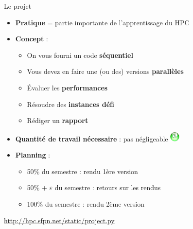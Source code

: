 \documentclass[10pt]{beamer}
\begin{document}
\begin{frame}
  \begin{block}{Le projet}
    \begin{itemize}
    \item \textbf{Pratique} = partie importante de l'apprentissage du HPC

      \medskip
      
    \item \textbf{Concept} :
      \begin{itemize}
      \item On vous fourni un code \textbf{séquentiel}
      \item Vous devez en faire une (ou des) versions \textbf{parallèles}
      \item Évaluer les \textbf{performances}
      \item Résoudre des \textbf{instances défi}
      \item Rédiger un \textbf{rapport}
      \end{itemize}
  
      \medskip

    \item \textbf{Quantité de travail nécessaire} : pas négligeable \includegraphics[width=0.5cm,trim=0 17mm 0 0]{triste}
      
      \medskip
      
    \item \textbf{Planning} :
      \begin{itemize}
      \item 50\% du semestre : rendu 1ère version
      \item 50\% + $\varepsilon$ du semestre : retours sur les rendus
      \item 100\% du semestre : rendu 2ème version
      \end{itemize}
    \end{itemize}
  \end{block}

  \medskip
  
  \centering 
\url{http://hpc.sfpn.net/static/project.py}
 
\end{frame}

\end{document}
